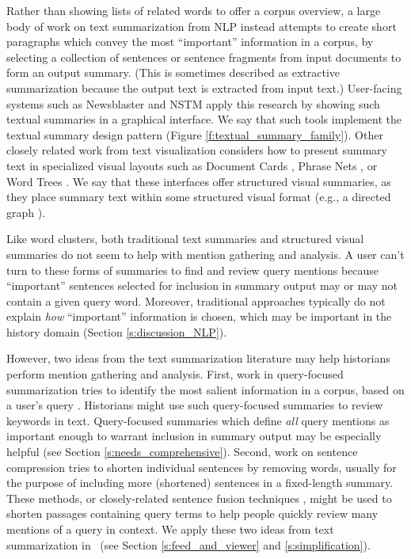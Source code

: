 Rather than showing lists of related words to offer a corpus overview, a large body of work on text summarization from NLP \cite{das2007survey} instead attempts to create short paragraphs which convey the most ``important'' information in a corpus, by selecting a collection of sentences or sentence fragments from input documents to form an output summary.
(This is sometimes described as extractive summarization \cite{das2007survey} because the output text is extracted from input text.) 
User-facing systems such as Newsblaster \cite{NewsblasterMain} and NSTM \cite{bambrick-etal-2020-nstm} apply this research by showing such textual summaries in a graphical interface.
We say that such tools implement the textual summary design pattern (Figure \ref{f:textual_summary_family}). 
Other closely related work from text visualization considers how to present summary text in specialized visual layouts such as Document Cards \cite{DocumentCards}, Phrase Nets \cite{phrasenet}, or Word Trees \cite{wordtree}.
We say that these interfaces offer structured visual summaries, as they place summary text within some structured visual format (e.g., a directed graph \cite{phrasenet}).

Like word clusters, both traditional text summaries and structured visual summaries do not seem to help with mention gathering and analysis. A user can't turn to these forms of summaries to find and review query mentions because ``important'' sentences selected for inclusion in summary output may or may not contain a given query word.
Moreover, traditional approaches typically do not explain \textit{how} ``important'' information is chosen, which may be important in the history domain (Section \ref{s:discussion_NLP}).

However, two ideas from the text summarization literature may help historians perform mention gathering and analysis.
First, work in query-focused summarization tries to identify the most salient information in a corpus, based on a user's query \cite{nenkova2012survey}.
Historians might use such query-focused summaries to review keywords in text. 
Query-focused summaries which define \textit{all} query mentions as important enough to warrant inclusion in summary output may be especially helpful (see Section \ref{s:needs_comprehensive}). 
Second, work on sentence compression \cite{Knight2000StatisticsBasedS,filippova-strube-2008-dependency,filippova2015sentence} tries to shorten individual sentences by removing words, usually for the purpose of including more (shortened) sentences in a fixed-length summary. 
These methods, or closely-related sentence fusion techniques \cite{barzilay-mckeown-2005-sentence}, might be used to shorten passages containing query terms to help people quickly review many mentions of a query in context.
We apply these two ideas from text summarization in \ours~(see Section \ref{s:feed_and_viewer} and \ref{s:simplification}).

